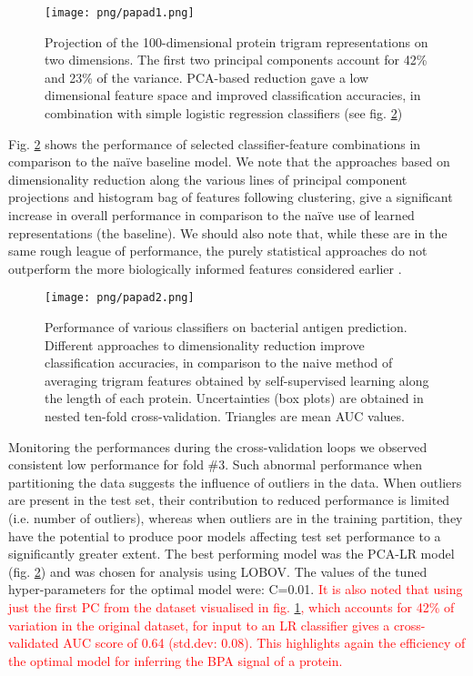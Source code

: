 \documentclass[10pt,journal,compsoc,twoside]{IEEEtran}
\begin{document}
\begin{figure}[!t]
\centering
\texttt{[image: png/papad1.png]}
\caption{Projection of the 100-dimensional protein trigram representations on two dimensions. The first two principal components account for 42\% and 23\% of the variance. PCA-based reduction gave a low dimensional feature space and improved classification accuracies, in combination with simple logistic regression classifiers (see fig. \ref{fig:fig-model-selection})}
\label{fig:fig-pca}
\end{figure}

Fig. \ref{fig:fig-model-selection} shows the performance of selected classifier-feature combinations in comparison to the naïve baseline model. We note that the approaches based on dimensionality reduction along the various lines of principal component projections and histogram bag of features following clustering, give a significant increase in overall performance in comparison to the naïve use of learned representations (the baseline). We should also note that, while these are in the same rough league of performance, the purely statistical approaches do not outperform the more biologically informed features considered earlier \cite{heinson_2019}.

\begin{figure}[!t]
\centering
\texttt{[image: png/papad2.png]}
\caption{Performance of various classifiers on bacterial antigen prediction. Different approaches to dimensionality reduction improve classification accuracies, in comparison to the naive method of averaging trigram features obtained by self-supervised learning along the length of each protein. Uncertainties (box plots) are obtained in nested ten-fold cross-validation. Triangles are mean AUC values.}
\label{fig:fig-model-selection}
\end{figure}

Monitoring the performances during the cross-validation loops we observed consistent low performance for fold \#3. Such abnormal performance when partitioning the data suggests the influence of outliers in the data. When outliers are present in the test set, their contribution to reduced performance is limited (i.e. number of outliers), whereas when outliers are in the training partition, they have the potential to produce poor models affecting test set performance to a significantly greater extent. The best performing model was the PCA-LR model (fig. \ref{fig:fig-model-selection}) and was chosen for analysis using LOBOV. The values of the tuned hyper-parameters for the optimal model were: C=0.01. \textcolor{red}{It is also noted that using just the first PC from the dataset visualised in fig. \ref{fig:fig-pca}, which accounts for 42\% of variation in the original dataset, for input to an LR classifier gives a cross-validated AUC score of 0.64 (std.dev: 0.08). This highlights again the efficiency of the optimal model for inferring the BPA signal of a protein.}
\end{document}
